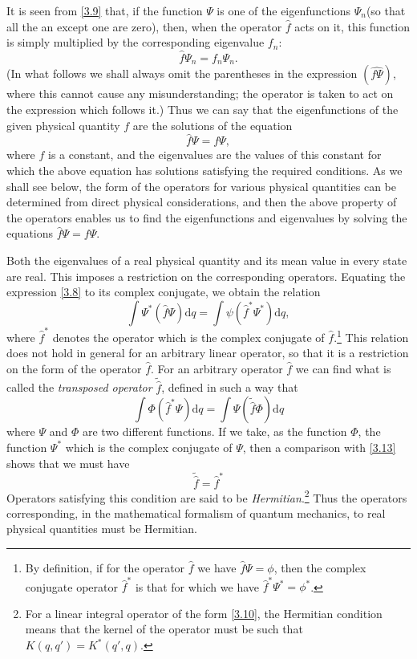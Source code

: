 It is seen from \eqref{3.9} that, if the function $ \Psi $ is one of the eigenfunctions $ \Psi_n $(so that all the an except one are zero), then, when the operator $ \hat{f} $ acts on it, this function is simply multiplied by the corresponding eigenvalue $ f_n $:
\begin{equation}\label{3.12}
\hat{f}\Psi_n=f_n\Psi_n.
\end{equation}
(In what follows we shall always omit the parentheses in the expression $ (\hat{f\Psi}) $, where this cannot cause any misunderstanding; the operator is taken to act on the expression which follows it.) Thus we can say that the eigenfunctions of the given physical quantity $ f $ are the solutions of the equation
\[ \hat{f}\Psi=f\Psi, \]
where $ f $ is a constant, and the eigenvalues are the values of this constant for which the above equation has solutions satisfying the required conditions. As we shall see below, the form of the operators for various physical quantities can be determined from direct physical considerations, and then the above property of the operators enables us to find the eigenfunctions and eigenvalues by solving the equations $ \hat{f}\Psi=f\Psi $.

Both the eigenvalues of a real physical quantity and its mean value in every state are real. This imposes a restriction on the corresponding operators. Equating the expression \eqref{3.8} to its complex conjugate, we obtain the relation
\begin{equation}\label{3.13}
\int\Psi^*(\hat{f}\Psi)\mathrm{d}q=\int\psi(\hat{f}^*\Psi^*)\mathrm{d}q,
\end{equation}
where $ \hat{f}^* $ denotes the operator which is the complex conjugate of $ \hat{f} $.\footnote{By definition, if for the operator $ \hat{f} $ we have $ \hat{f}\Psi=\phi $, then the complex conjugate operator $ \hat{f}^* $ is that for which we have $ \hat{f}^*\Psi^*=\phi^* $.
} This relation does not hold in general for an arbitrary linear operator, so that it is a restriction on the form of the operator $ \hat{f} $. For an arbitrary operator $ \hat{f} $ we can find what is called the \textit{transposed operator} $ \tilde{\hat{f}} $, defined in such a way that
\begin{equation}\label{3.14}
\int\Phi(\hat{f}^*\Psi)\mathrm{d}q=\int\Psi(\tilde{\hat{f}}\Phi)\mathrm{d}q
\end{equation}
where $ \Psi $ and $ \Phi $ are two different functions. If we take, as the function $ \Phi $, the function $ \Psi^* $ which is the complex conjugate of $ \Psi $, then a comparison with \eqref{3.13} shows that we must have
\begin{equation}\label{3.15}
\tilde{\hat{f}}=\hat{f}^*
\end{equation}
Operators satisfying this condition are said to be \textit{Hermitian}.\footnote{For a linear integral operator of the form \eqref{3.10}, the Hermitian condition means that the kernel of the operator must be such that $ K (q, q′) = K^*(q′, q) $.
} Thus the operators corresponding, in the mathematical formalism of quantum mechanics, to real physical quantities must be Hermitian.

